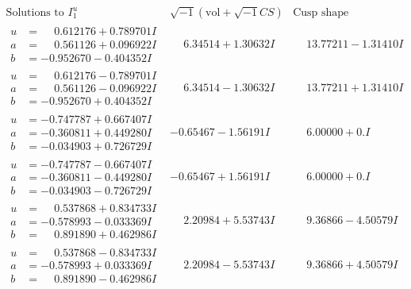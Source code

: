 \documentclass[1p]{elsarticle_modified}
\theoremstyle{definition}
\newcommand{\I}{\sqrt{-1}}
\begin{document}
$$\begin{array}{c|c|c}  
\text{Solutions to }I^u_{1}& \I (\text{vol} + \sqrt{-1}CS) & \text{Cusp shape}\\
 \hline 
\begin{aligned}
u &= \phantom{-}0.612176 + 0.789701 I \\
a &= \phantom{-}0.561126 + 0.096922 I \\
b &= -0.952670 - 0.404352 I\end{aligned}
 & \phantom{-}6.34514 + 1.30632 I & \phantom{-}13.77211 - 1.31410 I \\ \hline\begin{aligned}
u &= \phantom{-}0.612176 - 0.789701 I \\
a &= \phantom{-}0.561126 - 0.096922 I \\
b &= -0.952670 + 0.404352 I\end{aligned}
 & \phantom{-}6.34514 - 1.30632 I & \phantom{-}13.77211 + 1.31410 I \\ \hline\begin{aligned}
u &= -0.747787 + 0.667407 I \\
a &= -0.360811 + 0.449280 I \\
b &= -0.034903 + 0.726729 I\end{aligned}
 & -0.65467 - 1.56191 I & \phantom{-}6.00000 + 0. I\phantom{ +0.000000I} \\ \hline\begin{aligned}
u &= -0.747787 - 0.667407 I \\
a &= -0.360811 - 0.449280 I \\
b &= -0.034903 - 0.726729 I\end{aligned}
 & -0.65467 + 1.56191 I & \phantom{-}6.00000 + 0. I\phantom{ +0.000000I} \\ \hline\begin{aligned}
u &= \phantom{-}0.537868 + 0.834733 I \\
a &= -0.578993 - 0.033369 I \\
b &= \phantom{-}0.891890 + 0.462986 I\end{aligned}
 & \phantom{-}2.20984 + 5.53743 I & \phantom{-}9.36866 - 4.50579 I \\ \hline\begin{aligned}
u &= \phantom{-}0.537868 - 0.834733 I \\
a &= -0.578993 + 0.033369 I \\
b &= \phantom{-}0.891890 - 0.462986 I\end{aligned}
 & \phantom{-}2.20984 - 5.53743 I & \phantom{-}9.36866 + 4.50579 I \\ \hline\begin{aligned}

\end{aligned}
\end{array}$$
\end{document}

